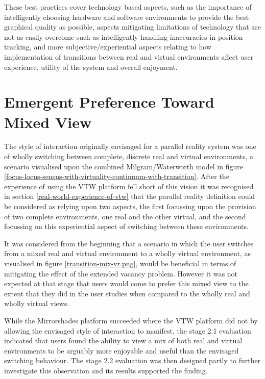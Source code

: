 These best practices cover technology based aspects, such as the importance of intelligently choosing hardware and software environments to provide the best graphical quality as possible, aspects mitigating limitations of technology that are not as easily overcome such as intelligently handling inaccuracies in position tracking, and more subjective/experiential aspects relating to how implementation of transitions between real and virtual environments affect user experience, utility of the system and overall enjoyment.


\section{Emergent Preference Toward Mixed View}

The style of interaction originally envisaged for a parallel reality system was one of wholly switching between complete, discrete real and virtual environments, a scenario visualised upon the combined Milgram/Waterworth model in figure \ref{focus-locus-sensus-with-virtuality-continuum-with-transition}. After the experience of using the VTW platform fell short of this vision it was recognised in section \ref{real-world-experience-of-vtw} that the parallel reality definition could be considered as relying upon two aspects, the first focussing upon the provision of two complete environments, one real and the other virtual, and the second focussing on this experiential aspect of switching between these environments.

It was considered from the beginning that a scenario in which the user switches from a mixed real and virtual environment to a wholly virtual environment, as visualised in figure \ref{transition-mix-vr.png}, would be beneficial in terms of mitigating the effect of the extended vacancy problem. However it was not expected at that stage that users would come to prefer this mixed view to the extent that they did in the user studies when compared to the wholly real and wholly virtual views.

While the Mirrorshades platform succeeded where the VTW platform did not by allowing the envisaged style of interaction to manifest, the stage 2.1 evaluation indicated that users found the ability to view a mix of both real and virtual environments to be arguably more enjoyable and useful than the envisaged switching behaviour. The stage 2.2 evaluation was then designed partly to further investigate this observation and its results supported the finding.


